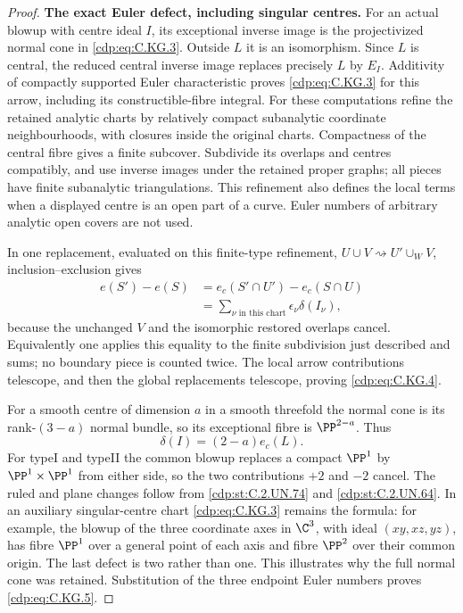 \begin{proof}
\par\medskip\noindent\textbf{The exact Euler defect, including singular centres.}
For an actual blowup with centre ideal
$I$, its exceptional inverse image is
the projectivized normal cone in
\eqref{cdp:eq:C.KG.3}. Outside $L$ it is an
isomorphism. Since $L$ is central,
the reduced central inverse image
replaces precisely $L$ by $E_I$.
Additivity of compactly supported
Euler characteristic proves \eqref{cdp:eq:C.KG.3}
for this arrow, including its
constructible-fibre integral.
For these computations refine the
retained analytic charts by relatively
compact subanalytic coordinate
neighbourhoods, with closures inside
the original charts. Compactness of
the central fibre gives a finite
subcover. Subdivide its overlaps and
centres compatibly, and use inverse
images under the retained proper
graphs; all pieces have finite
subanalytic triangulations. This
refinement also defines the local
terms when a displayed centre is an
open part of a curve. Euler numbers
of arbitrary analytic open covers
are not used.

In one replacement, evaluated on this
finite-type refinement,
$U\cup V\rightsquigarrow
U'\cup_WV$, inclusion--exclusion gives
\[
 \begin{split}
 e(S')-e(S)
   &=e_c(S'\cap U')-e_c(S\cap U)\\
   &=\sum_{\nu\text{ in this chart}}
                         \epsilon_\nu\delta(I_\nu),
 \end{split}
\tag{C.KG.9}\label{cdp:eq:C.KG.9}
\]
because the unchanged $V$ and the
isomorphic restored overlaps cancel.
Equivalently one applies this equality
to the finite subdivision just
described and sums; no boundary
piece is counted twice. The local
arrow contributions telescope, and
then the global replacements
telescope, proving \eqref{cdp:eq:C.KG.4}.

For a smooth centre of dimension $a$
in a smooth threefold the normal
cone is its rank-$(3-a)$ normal
bundle, so its exceptional fibre
is $\PP^{2-a}$. Thus
\[
                \delta(I)=(2-a)e_c(L).
\tag{C.KG.10}\label{cdp:eq:C.KG.10}
\]
For typeI and typeII the common
blowup replaces a compact $\PP^1$
by $\PP^1\times\PP^1$ from either
side, so the two contributions
$+2$ and $-2$ cancel. The ruled
and plane changes follow from
\ref{cdp:st:C.2.UN.74} and \ref{cdp:st:C.2.UN.64}. In an auxiliary
singular-centre chart \eqref{cdp:eq:C.KG.3}
remains the formula: for example,
the blowup of the three coordinate
axes in $\C^3$, with ideal
$(xy,xz,yz)$, has fibre $\PP^1$
over a general point of each axis
and fibre $\PP^2$ over their
common origin. The last defect
is two rather than one. This
illustrates why the full normal
cone was retained.
Substitution of the three endpoint
Euler numbers proves \eqref{cdp:eq:C.KG.5}.


\end{proof}
